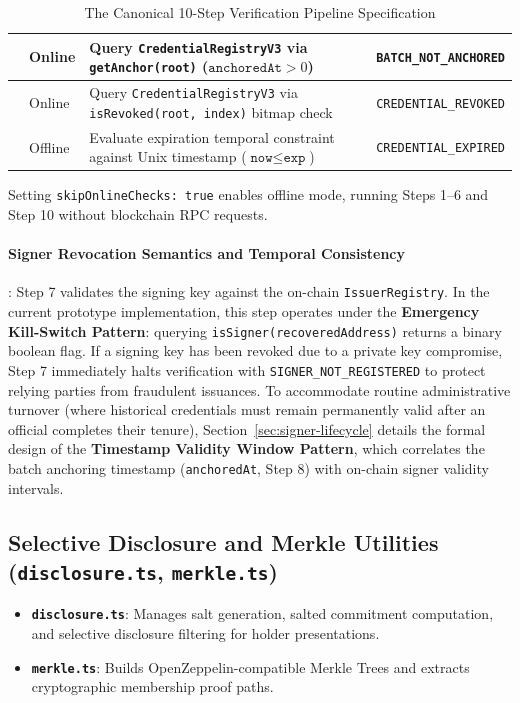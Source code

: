 \begin{table}[H]
\begin{tabular}{|>{\centering\arraybackslash}p{0.8cm}|>{\centering\arraybackslash}p{1.5cm}|>{\RaggedRight}p{7.2cm}|>{\RaggedRight}p{4.5cm}|}
\hline
8 & Online & Query \texttt{CredentialRegistryV3} via \texttt{getAnchor(root)} ($\texttt{anchoredAt} > 0$) & \texttt{BATCH\_NOT\_ANCHORED} \\
\hline
9 & Online & Query \texttt{CredentialRegistryV3} via \texttt{isRevoked(root, index)} bitmap check & \texttt{CREDENTIAL\_REVOKED} \\
\hline
10 & Offline & Evaluate expiration temporal constraint against Unix timestamp ($\texttt{now} \le \texttt{exp}$) & \texttt{CREDENTIAL\_EXPIRED} \\
\hline
\end{tabular}
\caption{The Canonical 10-Step Verification Pipeline Specification}
\label{tab:verify-pipeline}
\end{table}

Setting \texttt{skipOnlineChecks: true} enables offline mode, running Steps 1--6 and Step 10 without blockchain RPC requests.

\paragraph{Signer Revocation Semantics and Temporal Consistency}:
Step 7 validates the signing key against the on-chain \texttt{IssuerRegistry}. In the current prototype implementation, this step operates under the \textbf{Emergency Kill-Switch Pattern}: querying \texttt{isSigner(recoveredAddress)} returns a binary boolean flag. If a signing key has been revoked due to a private key compromise, Step 7 immediately halts verification with \texttt{SIGNER\_NOT\_REGISTERED} to protect relying parties from fraudulent issuances. To accommodate routine administrative turnover (where historical credentials must remain permanently valid after an official completes their tenure), Section~\ref{sec:signer-lifecycle} details the formal design of the \textbf{Timestamp Validity Window Pattern}, which correlates the batch anchoring timestamp (\texttt{anchoredAt}, Step 8) with on-chain signer validity intervals.

\subsection{Selective Disclosure and Merkle Utilities (\texttt{disclosure.ts}, \texttt{merkle.ts})}
\begin{itemize}
    \item \textbf{\texttt{disclosure.ts}}: Manages salt generation, salted commitment computation, and selective disclosure filtering for holder presentations.
    \item \textbf{\texttt{merkle.ts}}: Builds OpenZeppelin-compatible Merkle Trees and extracts cryptographic membership proof paths.
\end{itemize}

